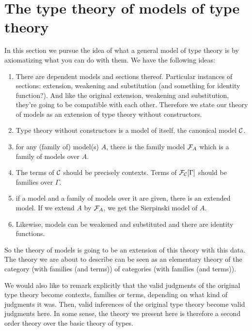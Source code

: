 \section{The type theory of models of type theory}
In this section we pursue the idea of what a general model of type theory is by
axiomatizing what you can do with them. We have the following ideas:
\begin{enumerate}
\item There are dependent models and sections thereof. Particular instances
of sections: extension, weakening and substitution (and something for identity
function?). And like the original
extension, weakening and substitution, they're going to be compatible with each
other. Therefore we state our theory of models as an extension of type theory
without constructors.
\item Type theory without constructors is a model of itself, the canonical model $\mathcal{C}$.
\item for any (family of) model(s) $A$, there is the family model $\mfam{A}$ which
is a family of models over $A$.
\item The terms of $\mathcal{C}$ should be precisely contexts. Terms of $\subst{\Gamma}{\mfam{\mctx}}$
should be families over $\Gamma$.
\item if a model and a family of models over it are given, there is an extended model.
If we extend $A$ by $\mfam{A}$, we get the Sierpinski model of $A$.
\item Likewise, models can be weakened and substituted and there are identity
functions.
\end{enumerate}
So the theory of models is going to be an extension of this theory with this
data. The theory we are about to describe can be seen as an elementary theory
of the category (with families (and terms)) of categories (with families (and terms)).

We would also like to remark explicitly that the valid judgments of the original type
theory become contexts, families or terms, depending on what kind of judgments
it was. Then, valid inferences of the original type theory become valid
judgments here. In some sense, the theory we present here is therefore a second
order theory over the basic theory of types. 

